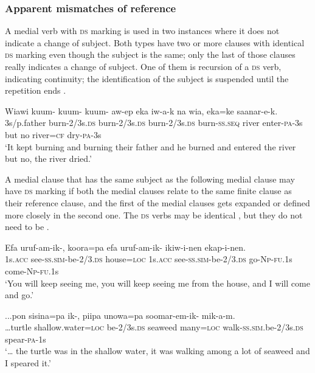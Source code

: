 \subsubsection{Apparent mismatches of reference}

A medial verb with \textsc{ds} marking is used in two instances where it does not indicate a change of subject. Both types have two or more clauses with identical \textsc{ds} marking even though the subject is the same; only the last of those clauses really indicates a change of subject. One of them is recursion of a \textsc{ds} verb, indicating continuity; the identification of the subject is suspended until the repetition ends \citep[201]{Reesink1987}. 

\ea%
\label{ex:8:x1493}
\gll Wiawi  kuum-  kuum-  kuum-  aw-ep eka  iw-a-k  na  wia,  eka=ke  saanar-e-k. \\
3s/p.father burn-2/3s.\textsc{ds} burn-2/3s.\textsc{ds} burn-2/3s.\textsc{ds} burn-\textsc{ss}.\textsc{seq} river enter-\textsc{pa}-3s but no river=\textsc{cf} dry-\textsc{pa}-3s\\
\glt`It kept burning and burning their father and he burned and entered the river but no, the river dried.'
\z


A medial clause that has the same subject as the following medial clause may have \textsc{ds} marking if both the medial clauses relate to the same finite clause as their reference clause, and the first of the medial clauses gets expanded or defined more closely in the second one. The \textsc{ds} verbs may be identical , but they do not need to be .

\ea%
\label{ex:8:x1494}
\gll Efa  uruf-am-ik-,  koora=pa  efa  uruf-am-ik- ikiw-i-nen  ekap-i-nen.\\
1s.\textsc{acc}  see-\textsc{ss}.\textsc{sim}-be-2/3.\textsc{ds} house=\textsc{loc} 1s.\textsc{acc} see-\textsc{ss}.\textsc{sim}-be-2/3.\textsc{ds} go-\textsc{Np}-\textsc{fu}.1s come-\textsc{Np}-\textsc{fu}.1s    \\
\glt`You will keep seeing me, you will keep seeing me from the house, and I will come and go.'
\z


\ea%
\label{ex:8:x1495}
\gll ...pon  sisina=pa  ik-,  piipa  unowa=pa soomar-em-ik-  mik-a-m. \\
{\dots}turtle  shallow.water=\textsc{loc} be-2/3s.\textsc{ds} seaweed  many=\textsc{loc} walk-\textsc{ss}.\textsc{sim}.be-2/3s.\textsc{ds} spear-\textsc{pa}-1s\\
\glt`{\dots} the turtle was in the shallow water, it was walking among a lot of seaweed and I speared it.'
\z


